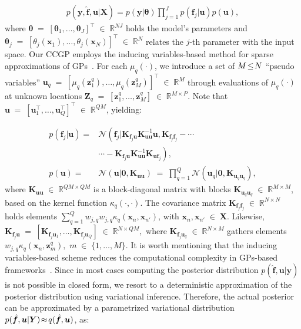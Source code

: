 \documentclass[journal]{IEEEtran}
\providecommand{\ve}[1]{{\bm{#1}}}%
\providecommand{\mat}[1]{{\bm{#1}}} %
\newcommand{\Real}{\mathbb{R}}
\DeclareMathOperator{\en}{\!\,\in\!\,}
\DeclareMathOperator{\igual}{\!\,=\!\,}
\providecommand{\s}[1]{\negthinspace#1\negthinspace}%
\providecommand{\ve}[1]{{\mathbf{#1}}}
\providecommand{\mat}[1]{{\mathbf{#1}}}
\newcommand{\gauss}{\mathcal{N}} %
\begin{document}
\begin{align}
p(\ve{y},\hat{\ve{f}},\ve{u}|\mat{X})=p(\ve{y}|\bm{\theta}) \prod_{j=1}^{J}p(\ve{f}_j|{\ve{u}})p({\ve{u}}),
\end{align} 
where $\bm{\theta}\igual[\bm{\theta}_1,\dots ,\bm{\theta}_J]^{\top}\en\Real^{NJ}$ holds the model's parameters and $\bm{\theta}_j\igual[\theta_j(\ve{x}_1),\dots ,\theta_j(\ve{x}_N)]^{\top}\en\Real^{N}$ relates the $j$-th parameter with the input space. Our CCGP employs the inducing variables-based method for sparse approximations of GPs~\cite{hensman2015scalable}. For each $\mu_q(\cdot)$, we introduce a set of $M\s{\leq}N$ ``pseudo variables'' $\ve{u}_ q\igual [\mu_q(\ve{z}_1^q), \dots , \mu_q(\ve{z}_M^q)]^{\top}\en \Real^{M}$ through evaluations of $\mu_q(\cdot)$ at unknown locations $\mat{Z}_q \igual [\ve{z}_1^q, \dots , \ve{z}_M^q]\en \Real^{M\times P}$. Note that ${\ve{u}} \igual \left[\ve{u}_1^{\top}, \dots , \ve{u}_Q^{\top} \right]^{\top} \en \Real^{QM}$, yielding:

\begin{align}
\label{eq:CCGPprior}
p(\ve{f}_j|{\ve{u}})=& \gauss\left(\ve{f}_j|\mat{K}_{\ve{f}_j{\ve{u}}}\mat{K}^{-1}_{{\ve{u}}{\ve{u}}}{\ve{u}},\mat{K}_{\ve{f}_j\ve{f}_j}\right.-\cdots \nonumber\\
&\cdots-\left.\mat{K}_{\ve{f}_j{\ve{u}}}\mat{K}^{-1}_{{\ve{u}}{\ve{u}}}\mat{K}_{{\ve{u}}\ve{f}_j}\right),\\
p({\ve{u}}) =& \gauss\left({\ve{u}}| \ve{0}, \mat{K}_{{\ve{u}}{\ve{u}}}\right)\igual \prod_{q=1}^{Q}\gauss(\ve{u}_q|\ve{0},\mat{K}_{\ve{u}_q\ve{u}_q}),
\end{align}
where $\mat{K}_{{\ve{u}}{\ve{u}}} \en \Real^{QM\times QM}$ is a block-diagonal matrix with blocks $\mat{K}_{\ve{u}_q\ve{u}_q}\en \Real^{M\times M}$, based on the kernel function ${\kappa}_q(\cdot,\cdot)$.  The covariance matrix $\mat{K}_{\ve{f}_j\ve{f}_j}\en \Real^{N\times N}$ 
holds elements $\sum_{q=1}^{Q}w_{j,q}w_{j,q}{\kappa}_q(\ve{x}_n,\ve{x}_{n'})$, with $\ve{x}_n,\ve{x}_{n'}\en\mat{X}$. Likewise, $\mat{K}_{\ve{f}_j{\ve{u}}}\igual [\mat{K}_{\ve{f}_j\ve{u}_1}, \dots , \mat{K}_{\ve{f}_j\ve{u}_Q}]\en \Real^{N\times QM},$ where $\mat{K}_{\ve{f}_j\ve{u}_q} \en \Real^{N\times M}$ gathers elements $w_{j,q}{\kappa}_q(\ve{x}_n, \ve{z}^q_m),$ $m\en\{1,\dots,M\}.$ It is worth  mentioning  that the inducing variables-based scheme reduces the computational complexity in GPs-based frameworks~\cite{alvarez2010efficient}.
Since in most cases computing the posterior distribution $p(\hat{\ve{f}},\ve{u}|\ve{y})$ is not possible in closed form, we resort to a deterministic approximation of the posterior distribution using variational inference. Therefore, the actual posterior can be approximated by a parametrized variational distribution $p(\hat{\ve{f}},{\ve{u}}|\mat{Y})\s{\approx} q(\hat{\ve{f}},{\ve{u}})$, as:
\end{document}
